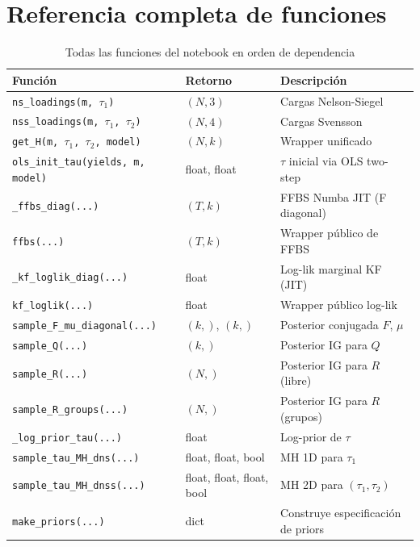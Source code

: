 \documentclass[12pt, a4paper]{article}
\theoremstyle{plain}
\theoremstyle{definition}
\theoremstyle{remark}
\begin{document}
\section{Referencia completa de funciones}

\begin{table}[H]
\centering
\caption{Todas las funciones del notebook en orden de dependencia}
\small
{}
\begin{tabular}{L{4cm} L{2.5cm} L{7.5cm}}
\toprule
{}
\color{white}\textbf{Función} & \color{white}\textbf{Retorno} & \color{white}\textbf{Descripción} \\
\midrule
\texttt{ns\_loadings(m, $\tau_1$)} & $(N,3)$ & Cargas Nelson-Siegel \\
\texttt{nss\_loadings(m, $\tau_1$, $\tau_2$)} & $(N,4)$ & Cargas Svensson \\
\texttt{get\_H(m, $\tau_1$, $\tau_2$, model)} & $(N,k)$ & Wrapper unificado \\
\texttt{ols\_init\_tau(yields, m, model)} & float, float & $\tau$ inicial via OLS two-step \\
\texttt{\_ffbs\_diag(...)} & $(T,k)$ & FFBS Numba JIT (F diagonal) \\
\texttt{ffbs(...)} & $(T,k)$ & Wrapper público de FFBS \\
\texttt{\_kf\_loglik\_diag(...)} & float & Log-lik marginal KF (JIT) \\
\texttt{kf\_loglik(...)} & float & Wrapper público log-lik \\
\texttt{sample\_F\_mu\_diagonal(...)} & $(k,)$, $(k,)$ & Posterior conjugada $F$, $\mu$ \\
\texttt{sample\_Q(...)} & $(k,)$ & Posterior IG para $Q$ \\
\texttt{sample\_R(...)} & $(N,)$ & Posterior IG para $R$ (libre) \\
\texttt{sample\_R\_groups(...)} & $(N,)$ & Posterior IG para $R$ (grupos) \\
\texttt{\_log\_prior\_tau(...)} & float & Log-prior de $\tau$ \\
\texttt{sample\_tau\_MH\_dns(...)} & float, float, bool & MH 1D para $\tau_1$ \\
\texttt{sample\_tau\_MH\_dnss(...)} & float, float, float, bool & MH 2D para $(\tau_1, \tau_2)$ \\
\texttt{make\_priors(...)} & dict & Construye especificación de priors \\

\end{tabular}
\end{table}
\end{document}
